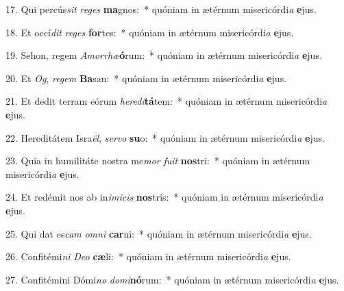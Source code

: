 17. Qui percús\textit{sit} \textit{re}\textit{ges} \textbf{ma}gnos:~*  quóniam in ætérnum misericórdi\textit{a} \textbf{e}jus.\

18. Et occí\textit{dit} \textit{re}\textit{ges} \textbf{for}tes:~*  quóniam in ætérnum misericórdi\textit{a} \textbf{e}jus.\

19. Sehon, regem \textit{A}\textit{mor}\textit{rhæ}\textbf{ó}rum:~*  quóniam in ætérnum misericórdi\textit{a} \textbf{e}jus.\

20. Et \textit{Og}, \textit{re}\textit{gem} \textbf{Ba}san:~*  quóniam in ætérnum misericórdi\textit{a} \textbf{e}jus.\

21. Et dedit terram eórum \textit{he}\textit{re}\textit{di}\textbf{tá}tem:~*  quóniam in ætérnum misericórdi\textit{a} \textbf{e}jus.\

22. Hereditátem Isra\textit{ël}, \textit{ser}\textit{vo} \textbf{su}o:~*  quóniam in ætérnum misericórdi\textit{a} \textbf{e}jus.\

23. Quia in humilitáte nostra me\textit{mor} \textit{fu}\textit{it} \textbf{nos}tri:~*  quóniam in ætérnum misericórdi\textit{a} \textbf{e}jus.\

24. Et redémit nos ab in\textit{i}\textit{mí}\textit{cis} \textbf{nos}tris:~*  quóniam in ætérnum misericórdi\textit{a} \textbf{e}jus.\

25. Qui dat es\textit{cam} \textit{om}\textit{ni} \textbf{car}ni:~*  quóniam in ætérnum misericórdi\textit{a} \textbf{e}jus.\

26. Confitémi\textit{ni} \textit{De}\textit{o} \textbf{cæ}li:~*  quóniam in ætérnum misericórdi\textit{a} \textbf{e}jus.\

27. Confitémini Dómi\textit{no} \textit{do}\textit{mi}\textbf{nó}rum:~*  quóniam in ætérnum misericórdi\textit{a} \textbf{e}jus.\

